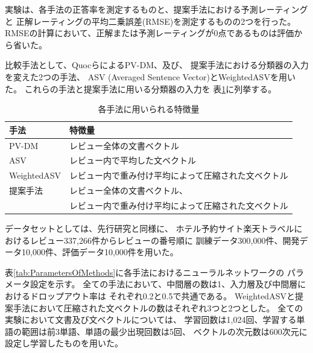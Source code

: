 \documentclass[twocolumn,a4paper]{ltjarticle}
\begin{document}
実験は、各手法の正答率を測定するものと、提案手法における予測レーティングと
正解レーティングの平均二乗誤差(RMSE)を測定するものの2つを行った。
RMSEの計算において、正解または予測レーティングが0点であるものは評価から省いた。

比較手法として、Quocら\cite{quoc14}によるPV-DM、及び、
提案手法における分類器の入力を変えた2つの手法、
ASV (Averaged Sentence Vector)とWeightedASVを用いた。
これらの手法と提案手法に用いる分類器の入力を
表\ref{tab:MethodFeatures}に列挙する。

\begin{table}[b!]
  \caption{各手法に用いられる特徴量}
  \centering
  \begin{tabularx}{\linewidth}{l | X} \label{tab:MethodFeatures}
    手法 & 特徴量 \\
    \hline
    PV-DM & レビュー全体の文書ベクトル \\
    \hline
    ASV & レビュー内で平均した文ベクトル \\
    \hline
    WeightedASV & レビュー内で重み付け平均によって圧縮された文ベクトル \\
    \hline
    提案手法 & レビュー全体の文書ベクトル、\\
             & レビュー内で重み付け平均によって圧縮された文ベクトル \\
  \end{tabularx}
\end{table}


データセットとしては、先行研究\cite{fujitani15}と同様に、
ホテル予約サイト楽天トラベルにおけるレビュー337,266件からレビューの番号順に
訓練データ300,000件、開発データ10,000件、評価データ10,000件を用いた。


表\ref{tab:ParametersOfMethods}に各手法におけるニューラルネットワークの
パラメータ設定を示す。
全ての手法において、中間層の数は1、入力層及び中間層におけるドロップアウト率は
それぞれ0.2と0.5で共通である。
WeightedASVと提案手法において圧縮された文ベクトルの数はそれぞれ3つと2つとした。
全ての実験において文書及び文ベクトルについては、
学習回数は1,024回、学習する単語の範囲は前3単語、単語の最少出現回数は5回、
ベクトルの次元数は600次元に設定し学習したものを用いた。
\end{document}

